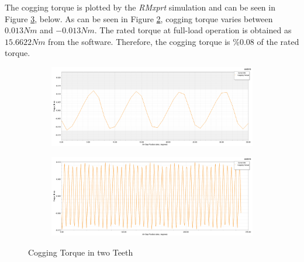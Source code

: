 \documentclass[a4paper, 11pt]{article}
\begin{document}
The cogging torque is plotted by the \textit{RMxprt} simulation and can be seen in Figure \ref{fig:Q3_coggingTorque}, below. As can be seen in Figure \ref{subfig:Q2_pitch_factor_2422}, cogging torque varies between $0.013 Nm$ and $-0.013 Nm$. The rated torque at full-load operation is obtained as $15.6622 Nm$ from the software. Therefore, the cogging torque is $\%0.08$ of the rated torque.


\begin{figure}[h!]
    \centering
    \begin{subfigure}[b]{1.00\textwidth}
        \includegraphics[width=\textwidth]{Q3_coggingTorque_0to35.png}
        \caption{}
        \label{subfig:Q2_dist_factor_2422}
    \end{subfigure}
    \begin{subfigure}[b]{1.00\textwidth}
        \includegraphics[width=\textwidth]{Q3_coggingTorque_0to360.png}
        \caption{}
        \label{subfig:Q2_pitch_factor_2422}
    \end{subfigure}
    \caption{Cogging Torque in two Teeth}
    \label{fig:Q3_coggingTorque}
\end{figure}

\newpage

 

\end{document}
